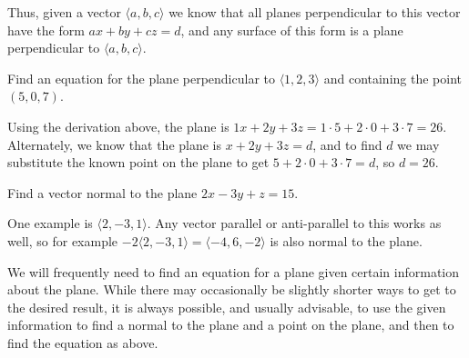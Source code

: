 Thus, given a vector $\langle a,b,c\rangle$ we know that all planes
perpendicular to this vector have the form $ax+by+cz=d$, and any surface
of this form is a plane perpendicular to $\langle a,b,c\rangle$.

\begin{example}
Find an equation for the plane perpendicular to $\langle 1,2,3\rangle$
and containing the point $(5,0,7)$.

Using the derivation above, 
the plane is $1x+2y+3z=1\cdot5+2\cdot0+3\cdot7=26$. Alternately, we
know that the plane is $x+2y+3z=d$, and to find $d$ we may substitute
the known point on the plane to get $5+2\cdot0+3\cdot7=d$, so $d=26$.
\end{example}

\begin{example}
Find a vector normal to the plane $2x-3y+z=15$.

One example is $\langle 2, -3,1\rangle$. Any vector parallel or
anti-parallel to this works as well, so for example
$-2\langle 2, -3,1\rangle=\langle -4,6,-2\rangle$ is also normal to the plane.
\end{example}

We will frequently need to find an equation for a plane given certain
information about the plane. While there may occasionally be slightly
shorter ways to get to the desired result, it is always possible, and
usually advisable, to use the given information to find a normal to
the plane and a point on the plane, and then to find the equation as
above. 

